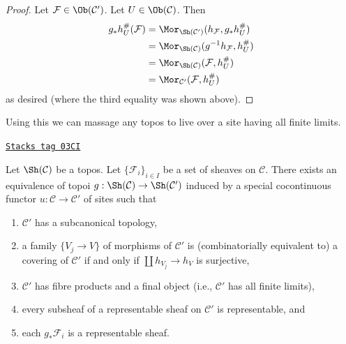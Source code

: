 \begin{proof}
\medskip\noindent
Let $\mathcal{F} \in \Ob(\mathcal{C}')$.
Let $U \in \Ob(\mathcal{C})$.
Then
\begin{align*}
g_*h_U^\#(\mathcal{F})
& =
\Mor_{\Sh(\mathcal{C}')}(h_\mathcal{F}, g_*h_U^\#) \\
& =
\Mor_{\Sh(\mathcal{C})}(g^{-1}h_\mathcal{F}, h_U^\#) \\
& =
\Mor_{\Sh(\mathcal{C})}(\mathcal{F}, h_U^\#) \\
& =
\Mor_{\mathcal{C}'}(\mathcal{F}, h_U^\#)
\end{align*}
as desired (where the third equality was shown above).
\end{proof}

Using this we can massage any topos to live over a site having
all finite limits.

\begin{lemma}
\label{sites-lemma-topos-good-site}
\href{https://stacks.math.columbia.edu/tag/03CI}{\texttt{Stacks tag 03CI}}

Let $\Sh(\mathcal{C})$ be a topos. Let $\{\mathcal{F}_i\}_{i \in I}$
be a set of sheaves on $\mathcal{C}$. There exists an equivalence of topoi
$g : \Sh(\mathcal{C}) \to \Sh(\mathcal{C}')$ induced by a special
cocontinuous functor $u : \mathcal{C} \to \mathcal{C}'$ of sites
such that
\begin{enumerate}
\item $\mathcal{C}'$ has a subcanonical topology,
\item a family $\{V_j \to V\}$ of morphisms of $\mathcal{C}'$
is (combinatorially equivalent to) a covering of $\mathcal{C}'$
if and only if $\coprod h_{V_j} \to h_V$ is surjective,
\item $\mathcal{C}'$ has fibre products and a final object
(i.e., $\mathcal{C}'$ has all finite limits),
\item every subsheaf of a representable sheaf on $\mathcal{C}'$
is representable, and
\item each $g_*\mathcal{F}_i$ is a representable sheaf.
\end{enumerate}
\end{lemma}

